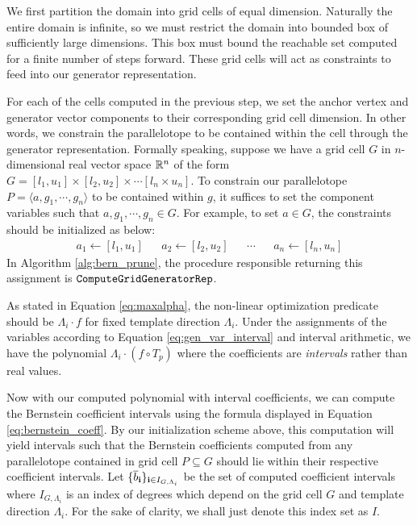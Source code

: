 \begin{enumerate}
 We first partition the domain into grid cells of equal dimension. Naturally the entire domain is infinite, so we must restrict the domain into bounded box of sufficiently large dimensions. This box must bound the reachable set computed for a finite number of steps forward. These grid cells will act as constraints to feed into our generator representation.

 For each of the cells computed in the previous step, we set the anchor vertex and generator vector components to their corresponding grid cell dimension. In other words, we constrain the parallelotope to be contained within the cell through the generator representation. Formally speaking, suppose we have a grid cell $G$ in $n$-dimensional real vector space ${\mathbb{R}}^n$ of the form $G = [l_1,u_1] \times [l_2, u_2] \times \cdots [l_n \times u_n]$. To constrain our parallelotope $P = \langle a, g_1, \cdots, g_n\rangle$ to be contained within $g$, it suffices to set the component variables such that $a, g_1, \cdots, g_n \in G$. For example, to set $a \in G$, the constraints should be initialized as below:
\begin{align}
\label{eq:gen_var_interval}
  a_1 \gets [l_1,u_1] & & a_2 \gets [l_2, u_2] & & \cdots & & a_n \gets [l_n,u_n]
\end{align}
%
%
In Algorithm \ref{alg:bern_prune}, the procedure responsible returning this assignment is $\texttt{ComputeGridGeneratorRep}$.

 As stated in Equation \ref{eq:maxalpha}, the non-linear optimization predicate should be $\Lambda_i\cdot f$ for fixed template direction $\Lambda_i$. Under the assignments of the variables according to Equation \ref{eq:gen_var_interval} and interval arithmetic, we have the polynomial $\Lambda_i\cdot(f \circ T_p)$ where the coefficients are \emph{intervals} rather than real values.

 Now with our computed polynomial with interval coefficients, we can compute the Bernstein coefficient intervals using the formula displayed in Equation \ref{eq:bernstein_coeff}. By our initialization scheme above, this computation will yield intervals such that the Bernstein coefficients computed from any parallelotope contained in grid cell $P \subseteq G$ should lie within their respective coefficient intervals. Let $\{\overline{b}_{{\bf i}}\}_{{\bf i} \in I_{G,\Lambda_i}}$ be the set of computed coefficient intervals where $I_{G,\Lambda_i}$ is an index of degrees which depend on the grid cell $G$ and template direction $\Lambda_i$. For the sake of clarity, we shall just denote this index set as $I$.


\end{enumerate}
